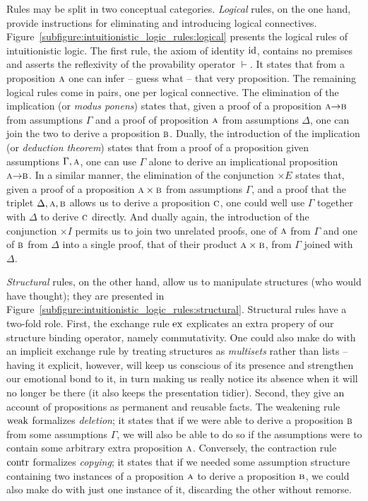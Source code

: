 Rules may be split in two conceptual categories.
\textit{Logical} rules, on the one hand, provide instructions for eliminating and introducing logical connectives.
Figure~\ref{subfigure:intuitionistic_logic_rules:logical} presents the logical rules of intuitionistic logic.
The first rule, the axiom of identity $\mathrm{id}$, contains no premises and asserts the reflexivity of the provability operator $\vdash$. 
It states that from a proposition $\normalfont\textsc{a}$ one can infer -- guess what -- that very proposition.
The remaining logical rules come in pairs, one per logical connective.
The elimination of the implication (or \textit{modus ponens}) states that, given a proof of a proposition $\smallprop{a} \ii \prop{b}$ from assumptions $\Gamma$ and a proof of proposition $\normalfont\textsc{a}$ from assumptions $\Delta$, one can join the two to derive a proposition $\normalfont\textsc{b}$.
Dually, the introduction of the implication (or \textit{deduction theorem}) states that from a proof of a proposition  given assumptions $\Gamma, \normalfont\textsc{a}$, one can use $\Gamma$ alone to derive an implicational proposition $\smallprop{a} \ii \smallprop{b}$.
In a similar manner, the elimination of the conjunction $\times E $ states that, given a proof of a proposition $\normalfont\textsc{a} \times \normalfont\textsc{b}$ from assumptions $\Gamma$, and a proof that the triplet $\Delta, \normalfont\textsc{a}, \normalfont\textsc{b}$ allows us to derive a proposition $\normalfont\textsc{c}$, one could well use $\Gamma$ together with $\Delta$ to derive $\normalfont\textsc{c}$ directly.
And dually again, the introduction of the conjunction $\times I$ permits us to join two unrelated proofs, one of $\normalfont\textsc{a}$ from $\Gamma$ and one of $\normalfont\textsc{b}$ from $\Delta$ into a single proof, that of their product $\normalfont\textsc{a} \times \normalfont\textsc{b}$, from $\Gamma$ joined with $\Delta$.

\textit{Structural} rules, on the other hand, allow us to manipulate structures (who would have thought); they are presented in Figure~\ref{subfigure:intuitionistic_logic_rules:structural}.
Structural rules have a two-fold role.
First, the exchange rule $\mathrm{ex}$ explicates an extra propery of our structure binding operator, namely commutativity.
One could also make do with an implicit exchange rule by treating structures as \textit{multisets} rather than lists -- having it explicit, however, will keep us conscious of its presence and strengthen our emotional bond to it, in turn making us really notice its absence when it will no longer be there (it also keeps the presentation tidier).
Second, they give an account of propositions as permanent and reusable facts.
The weakening rule $\mathrm{weak}{}$ formalizes \textit{deletion}; it states that if we were able to derive a proposition $\normalfont\textsc{b}$ from some assumptions $\Gamma$, we will also be able to do so if the assumptions were to contain some arbitrary extra proposition $\normalfont\textsc{a}$.
Conversely, the contraction rule $\mathrm{contr}{}$ formalizes \textit{copying}; it states that if we needed some assumption structure containing two instances of a proposition $\normalfont\textsc{a}$ to derive a proposition $\normalfont\textsc{b}$, we could also make do with just one instance of it, discarding the other without remorse.

